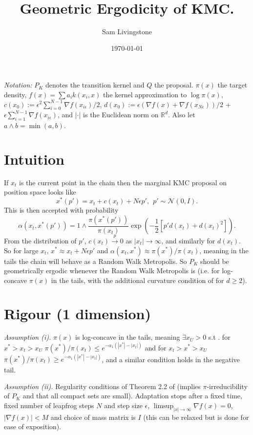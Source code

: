 \documentclass{article}
\title{\Large \bfseries Geometric Ergodicity of KMC.}
\author{Sam Livingstone}
\date{\today}
\begin{document}
\maketitle

\emph{Notation:} $P_K$ denotes the transition kernel and $Q$ the proposal.  $\pi(x)$ the target density, $f(x) = \sum a_i k(x_i,x)$ the kernel approximation to $\log\pi(x)$, $c(x_0) := \epsilon^2\sum_{i=0}^{N-1}\nabla f(x_{i\epsilon})/2$,
$d(x_0) := \epsilon(\nabla f(x) + \nabla f(x_{N\epsilon}))/2$ + $\epsilon \sum_{i=1}^{N-1} \nabla f(x_{i\epsilon})$, and $|\cdot|$ is the Euclidean norm on $\mathbb{R}^d$.  Also let $a \wedge b = \min(a,b)$.

\section{Intuition}

If $x_t$ is the current point in the chain then the marginal KMC proposal on position space looks like
\[
x^*(p') = x_t + c(x_t) + N\epsilon p', ~~ p' \sim \mathcal{N}(0,I).
\]
This is then accepted with probability
\[
\alpha(x_t,x^*(p')) = 1 \wedge \frac{\pi(x^*(p'))}{\pi(x_t)} \exp \left( - \frac{1}{2} [ p' d(x_t) + d(x_t)^2] \right).
\]
From the distribution of $p'$, $c(x_t) \overset{p}{\to} 0$ as $|x_t| \to \infty$, and similarly for $d(x_t)$.  So for large $x_t$, $x^* \approx x_t + N\epsilon p'$ and $\alpha(x_t,x^*) \approx \pi(x^*)/\pi(x_t)$, meaning in the tails the chain will behave as a Random Walk Metropolis.  So $P_K$ should be geometrically ergodic whenever the Random Walk Metropolis is (i.e. for log-concave $\pi(x)$ in the tails, with the additional curvature condition of \cite{rob1996} for $d \geq 2$).

\section{Rigour (1 dimension)}

\emph{Assumption (i).} $\pi(x)$ is log-concave in the tails, meaning $\exists x_U > 0$ s.t . for $x^* > x_t > x_U$ $\pi(x^*)/\pi(x_t) \leq e^{-\alpha_1(|x^*| - |x_t|)}$ and for $x_t > x^* > x_U$ $\pi(x^*)/\pi(x_t) \geq e^{-\alpha_1(|x^*| - |x_t|)}$, and a similar condition holds in the negative tail.

\emph{Assumption (ii).} Regularity conditions of Theorem 2.2 of \cite{rob1996} (implies $\pi$-irreducibility of $P_K$ and that all compact sets are small).  Adaptation stops after a fixed time, fixed number of leapfrog steps $N$ and step size $\epsilon$, $\limsup_{|x| \to \infty}\nabla f(x) =  0$, $|\nabla f(x)| < M$ and choice of mass matrix is $I$ (this can be relaxed but is done for ease of exposition).
\end{document}
